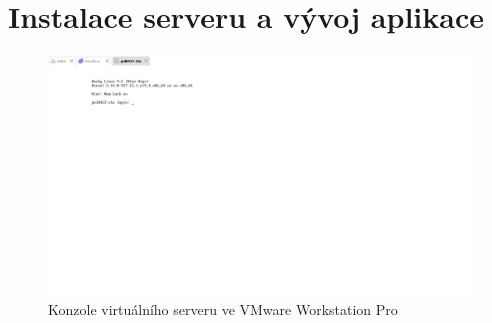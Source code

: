 \chapter{Instalace serveru a vývoj aplikace}

\begin{figure}
    \centering
    \includegraphics[width=\textwidth]{Figures/vmware_console.jpg}
    \caption{Konzole virtuálního serveru ve VMware Workstation Pro}
    \label{fig:vmware-workstation-pro}
\end{figure}

\newpage        %







\newpage







\newpage        %

